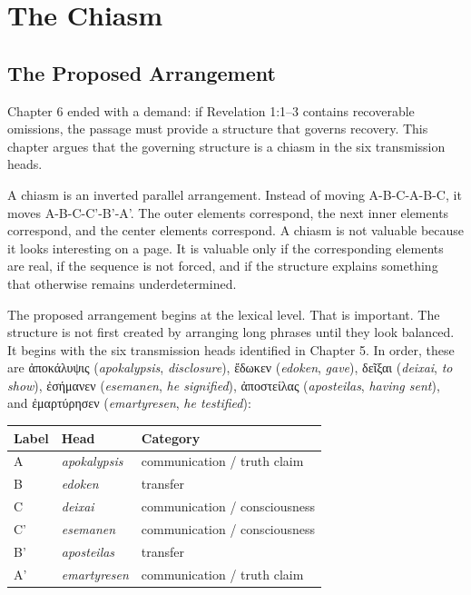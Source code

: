 \chapter{The Chiasm}

\section{The Proposed Arrangement}

Chapter 6 ended with a demand: if Revelation 1:1--3 contains recoverable omissions, the passage must provide a structure that governs recovery. This chapter argues that the governing structure is a chiasm in the six transmission heads.

A chiasm is an inverted parallel arrangement. Instead of moving A-B-C-A-B-C, it moves A-B-C-C'-B'-A'. The outer elements correspond, the next inner elements correspond, and the center elements correspond. A chiasm is not valuable because it looks interesting on a page. It is valuable only if the corresponding elements are real, if the sequence is not forced, and if the structure explains something that otherwise remains underdetermined.

The proposed arrangement begins at the lexical level. That is important. The structure is not first created by arranging long phrases until they look balanced. It begins with the six transmission heads identified in Chapter 5. In order, these are \textgreek{ἀποκάλυψις} (\textit{apokalypsis}, \textit{disclosure}), \textgreek{ἔδωκεν} (\textit{edoken}, \textit{gave}), \textgreek{δεῖξαι} (\textit{deixai}, \textit{to show}), \textgreek{ἐσήμανεν} (\textit{esemanen}, \textit{he signified}), \textgreek{ἀποστείλας} (\textit{aposteilas}, \textit{having sent}), and \textgreek{ἐμαρτύρησεν} (\textit{emartyresen}, \textit{he testified}):

\begin{center}
\begin{longtable}{@{}p{}p{}p{}@{}}
\toprule
Label & Head & Category \\
\midrule
A & \textit{apokalypsis} & communication / truth claim \\
B & \textit{edoken} & transfer \\
C & \textit{deixai} & communication / consciousness \\
C' & \textit{esemanen} & communication / consciousness \\
B' & \textit{aposteilas} & transfer \\
A' & \textit{emartyresen} & communication / truth claim \\
\bottomrule
\end{longtable}
\end{center}

